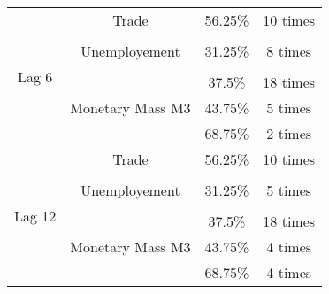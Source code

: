 \begin{table}[t]
\begin{tabular}{lccc}
    \multicolumn{1}{c|}{\multirow{7}{*}{Lag 6}}      & Trade                             & 56.25\%                   & 10 times \\
    \multicolumn{1}{c|}{}                           &                                   &                           &          \\
    \multicolumn{1}{c|}{}                           & Unemployement                     & 31.25\%                   & 8 times \\
    \multicolumn{1}{c|}{}                           &                                   &                           &          \\
    \multicolumn{1}{c|}{}                           & \multirow{3}{*}{Monetary Mass M3} & 37.5\%                    & 18 times \\
    \multicolumn{1}{c|}{}                           &                                   & 43.75\%                   & 5 times  \\
    \multicolumn{1}{c|}{}                           &                                   & 68.75\%                   & 2 times  \\ \cline{1-4}    

    \multicolumn{1}{c|}{\multirow{7}{*}{Lag 12}}     & Trade                             & 56.25\%                   & 10 times \\
    \multicolumn{1}{c|}{}                           &                                   &                           &          \\    
    \multicolumn{1}{c|}{}                           & Unemployement                     & 31.25\%                   & 5 times \\
    \multicolumn{1}{c|}{}                           &                                   &                           &          \\    
    \multicolumn{1}{c|}{}                           & \multirow{3}{*}{Monetary Mass M3} & 37.5\%                    & 18 times \\
    \multicolumn{1}{c|}{}                           &                                   & 43.75\%                   & 4 times  \\
    \multicolumn{1}{c|}{}                           &                                   & 68.75\%                   & 4 times  \\ 

    \bottomrule
  \end{tabular}
  \label{table:OptimalSplitsJP}
  \vspace{1em}  
\end{table}



